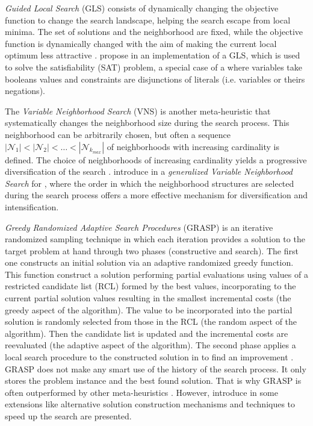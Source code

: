 {\it Guided Local Search} (GLS) \cite{Christos2010} consists of dynamically changing the objective function to change the search landscape, helping the search escape from local minima. The set of solutions and the neighborhood are fixed, while the objective function is dynamically changed with the aim of making the current local optimum less attractive \cite{Blum2003}.  propose in \cite{Mills2000} an implementation of a GLS, which is used to solve the satisfiability (SAT) problem, a special case of a \csp{} where variables take booleans values and constraints are disjunctions of literals (i.e. variables or theirs negations).

The \textit{Variable Neighborhood Search} (VNS) is another meta-heuristic that systematically changes the neighborhood size during the search process. This neighborhood can be arbitrarily chosen, but often a sequence $\left|\mathcal{N}_1\right|<\left|\mathcal{N}_2\right|< \dots<\left|\mathcal{N}_{k_{max}}\right|$ of neighborhoods with increasing cardinality is defined. The choice of neighborhoods of increasing cardinality yields a progressive diversification of the search \cite{PierreNenad,Blum2003}.  introduce in \cite{Bouhmala2015} a \textit{generalized Variable Neighborhood Search} for \COPs, where the order in which the neighborhood structures are selected during the search process offers a more effective mechanism for diversification and intensification. %

{\it Greedy Randomized Adaptive Search Procedures} (GRASP) is an iterative randomized sampling technique in which each iteration provides a solution to the target problem at hand through two phases (constructive and search). The first one constructs an initial solution via an adaptive randomized greedy function. This function construct a solution performing partial evaluations using values of a restricted candidate list (RCL) formed by the best values, incorporating to the current partial solution values resulting in the smallest incremental costs (the greedy aspect of the algorithm). The value to be incorporated into the partial solution is randomly selected from those in the RCL (the random aspect of the algorithm). Then the candidate list is updated and the incremental costs are reevaluated (the adaptive aspect of the algorithm). The second phase applies a local search procedure to the constructed solution in to find an improvement \cite{Feo95}. GRASP does not make any smart use of the history of the search process. It only stores the problem instance and the best found solution. That is why GRASP is often outperformed by other meta-heuristics \cite{Blum2003}. However,  introduce in \cite{Resende2009} some extensions like alternative solution construction mechanisms and techniques to speed up the search are presented.


